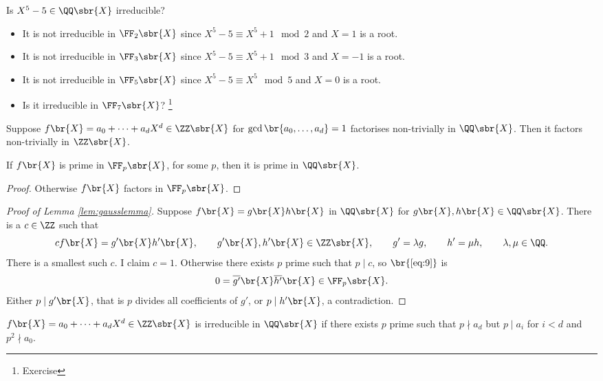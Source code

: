 \begin{example*}
Is $ X^5 - 5 \in \QQ\sbr{X} $ irreducible?
\begin{itemize}
\item It is not irreducible in $ \FF_2\sbr{X} $ since $ X^5 - 5 \equiv X^5 + 1 \mod 2 $ and $ X = 1 $ is a root.
\item It is not irreducible in $ \FF_3\sbr{X} $ since $ X^5 - 5 \equiv X^5 + 1 \mod 3 $ and $ X = -1 $ is a root.
\item It is not irreducible in $ \FF_5\sbr{X} $ since $ X^5 - 5 \equiv X^5 \mod 5 $ and $ X = 0 $ is a root.
\item Is it irreducible in $ \FF_7\sbr{X} $? \footnote{Exercise}
\end{itemize}
\end{example*}

\begin{lemma}
\label{lem:gausslemma}
Suppose $ f\br{X} = a_0 + \dots + a_dX^d \in \ZZ\sbr{X} $ for $ \gcd\br{a_0, \dots, a_d} = 1 $ factorises non-trivially in $ \QQ\sbr{X} $. Then it factors non-trivially in $ \ZZ\sbr{X} $.
\end{lemma}

\begin{corollary}
If $ f\br{X} $ is prime in $ \FF_p\sbr{X} $, for some $ p $, then it is prime in $ \QQ\sbr{X} $.
\end{corollary}

\begin{proof}
Otherwise $ f\br{X} $ factors in $ \FF_p\sbr{X} $.
\end{proof}

\begin{proof}[Proof of Lemma \ref{lem:gausslemma}]
Suppose $ f\br{X} = g\br{X}h\br{X} $ in $ \QQ\sbr{X} $ for $ g\br{X}, h\br{X} \in \QQ\sbr{X} $. There is a $ c \in \ZZ $ such that
\begin{equation}
\label{eq:9}
cf\br{X} = g'\br{X}h'\br{X}, \qquad g'\br{X}, h'\br{X} \in \ZZ\sbr{X}, \qquad g' = \lambda g, \qquad h' = \mu h, \qquad \lambda, \mu \in \QQ.
\end{equation}
There is a smallest such $ c $. I claim $ c = 1 $. Otherwise there exists $ p $ prime such that $ p \mid c $, so $ \br{\ref{eq:9}} $ is
$$ 0 = \overline{g'}\br{X}\overline{h'}\br{X} \in \FF_p\sbr{X}. $$
Either $ p \mid g'\br{X} $, that is $ p $ divides all coefficients of $ g' $, or $ p \mid h'\br{X} $, a contradiction.
\end{proof}

\begin{corollary}[Eisenstein]
$ f\br{X} = a_0 + \dots + a_dX^d \in \ZZ\sbr{X} $ is irreducible in $ \QQ\sbr{X} $ if there exists $ p $ prime such that $ p \nmid a_d $ but $ p \mid a_i $ for $ i < d $ and $ p^2 \nmid a_0 $.
\end{corollary}


